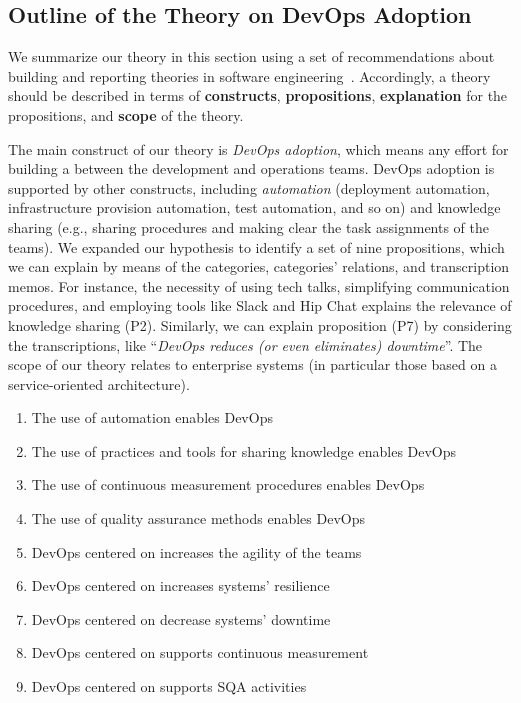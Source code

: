 \subsection{Outline of the Theory on DevOps Adoption}

We summarize our theory in this section using a 
set of recommendations about building and reporting
theories in software engineering~\cite{sjoberg2008}.
Accordingly, a theory should be described in
terms of {\bf constructs},
{\bf propositions}, {\bf explanation} for the propositions,
and {\bf scope} of the theory.

The main construct of our theory is \emph{DevOps adoption},
which means any effort for building a \cc between
the development and operations teams. DevOps adoption is
supported by other constructs, including \emph{automation}
(deployment automation, infrastructure provision automation,
test automation, and so on) and knowledge sharing (e.g.,
sharing procedures and making clear the task assignments
of the teams). We expanded our hypothesis to identify
a set of nine propositions, which we can explain
by means of the categories, categories' relations,
and transcription memos. For instance, the necessity of
using tech talks, simplifying communication procedures, and employing
tools like Slack and Hip Chat explains the relevance of knowledge sharing
(P2). Similarly, we can explain proposition (P7) by 
considering the transcriptions, like
``\emph{DevOps reduces (or even eliminates) downtime}''.
The scope of our theory relates to
enterprise systems (in particular those based on
a service-oriented architecture). 


\begin{enumerate}[(P1)]
 \item The use of automation enables DevOps
 \item The use of practices and tools for sharing knowledge enables DevOps
 \item The use of continuous measurement procedures enables DevOps
 \item The use of quality assurance methods enables DevOps
 \item DevOps centered on \cc increases the agility of the teams
 \item DevOps centered on \cc increases systems' resilience 
 \item DevOps centered on \cc decrease systems'  downtime
 \item DevOps centered on \cc supports continuous measurement 
 \item DevOps centered on \cc supports SQA activities   
\end{enumerate}

